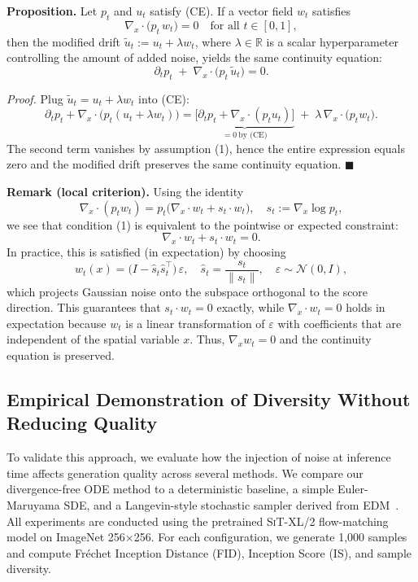 \documentclass{article}
\begin{document}
\bigskip
\noindent\textbf{Proposition.}  
Let \(p_t\) and \(u_t\) satisfy \textup{(CE)}.  
If a vector field \(w_t\) satisfies
\[
\nabla_x\!\cdot\!\bigl(p_t\,w_t\bigr)=0
\quad\text{for all }t\in[0,1],
\tag{1}
\]
then the modified drift
\(
\tilde u_t := u_t + \lambda w_t
\),
where \(\lambda \in \mathbb{R}\) is a scalar hyperparameter controlling the amount of added noise,
yields the same continuity equation:
\[
\partial_t p_t\;+\;\nabla_x\!\cdot\!\bigl(p_t\,\tilde u_t\bigr)=0.
\]

\smallskip
\noindent\emph{Proof.}  
Plug \(\tilde u_t = u_t + \lambda w_t\) into \textup{(CE)}:
\[
\partial_t p_t + \nabla_x\!\cdot\!\bigl(p_t(u_t+\lambda w_t)\bigr)
   = \underbrace{\bigl[\partial_t p_t + \nabla_x\!\cdot(p_t u_t)\bigr]}_{=0\ \text{by (CE)}}
     \;+\;\lambda\,\nabla_x\!\cdot\!\bigl(p_t w_t\bigr).
\]
The second term vanishes by assumption \textup{(1)}, hence the entire expression equals zero and the modified drift preserves the same continuity equation.
\hfill$\blacksquare$

\bigskip
\noindent\textbf{Remark (local criterion).}
Using the identity
\[
\nabla_x\!\cdot(p_t w_t)=p_t\bigl(\nabla_x\!\cdot w_t + s_t\!\cdot w_t\bigr),
\quad s_t := \nabla_x\!\log p_t,
\]
we see that condition \textup{(1)} is equivalent to the pointwise or expected constraint:
\[
\boxed{\nabla_x\!\cdot w_t + s_t\!\cdot w_t = 0.}
\]
In practice, this is satisfied (in expectation) by choosing
\[
w_t(x) = \bigl(I - \hat s_t \hat s_t^\top\bigr)\,\varepsilon,
\quad \hat s_t = \frac{s_t}{\|s_t\|},
\quad \varepsilon \sim \mathcal{N}(0,I),
\]
which projects Gaussian noise onto the subspace orthogonal to the score direction. This guarantees that \(s_t \cdot w_t = 0\) exactly, while \(\nabla_x \cdot w_t = 0\) holds in expectation because \(w_t\) is a linear transformation of \(\varepsilon\) with coefficients that are independent of the spatial variable \(x\). Thus, \(\nabla_x w_t = 0\) and the continuity equation is preserved.

\subsection{Empirical Demonstration of Diversity Without Reducing Quality}
\label{sec:noise_study}

To validate this approach, we evaluate how the injection of noise at inference time affects generation quality across several methods. We compare our divergence-free ODE method to a deterministic baseline, a simple Euler-Maruyama SDE, and a Langevin-style stochastic sampler derived from EDM~\cite{karras2022elucidatingdesignspacediffusionbased}. All experiments are conducted using the pretrained \textsc{SiT-XL/2} flow-matching model on ImageNet 256×256. For each configuration, we generate 1,000 samples and compute Fréchet Inception Distance (FID), Inception Score (IS), and sample diversity.
\end{document}
